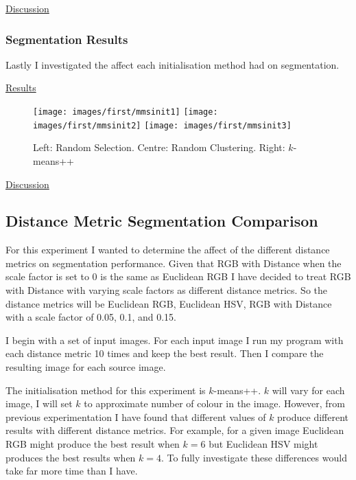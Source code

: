 \documentclass{article}
\begin{document}
\underline{Discussion}


\subsubsection{Segmentation Results}

Lastly I investigated the affect each initialisation method had on segmentation. 


\underline{Results}

\begin{figure}[H]
\begin{center}
\texttt{[image: images/first/mmsinit1]}
\texttt{[image: images/first/mmsinit2]}
\texttt{[image: images/first/mmsinit3]}
\caption{Left: Random Selection. Centre: Random Clustering. Right: $k$-means++ }
\end{center}
\end{figure}


\underline{Discussion}


\subsection{Distance Metric Segmentation Comparison}

For this experiment I wanted to determine the affect of the different distance metrics on segmentation performance. Given that RGB with Distance when the scale factor is set to 0 is the same as Euclidean RGB I have decided to treat RGB with Distance with varying scale factors as different distance metrics. So the distance metrics will be Euclidean RGB, Euclidean HSV, RGB with Distance with a scale factor of 0.05, 0.1, and 0.15. 

I begin with a set of input images. For each input image I run my program with each distance metric 10 times and keep the best result. Then I compare the resulting image for each source image. 

The initialisation method for this experiment is $k$-means++. $k$ will vary for each image, I will set $k$ to approximate number of colour in the image. However, from previous experimentation I have found that different values of $k$ produce different results with different distance metrics. For example, for a given image Euclidean RGB might produce the best result when $k = 6$ but Euclidean HSV might produces the best results when $k = 4$. To fully investigate these differences would take far more time than I have. 
\end{document}
